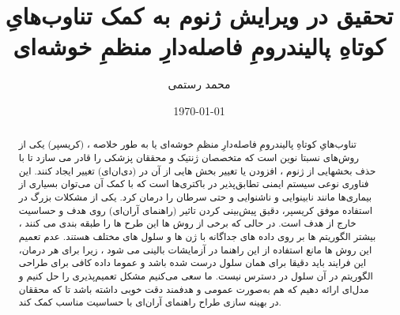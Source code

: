 \documentclass[12pt,a4paper,BCOR=.7cm,headsepline,bibliography=totoc]{report}
\title{تحقیق در ویرایش ژنوم به کمک تناوب‌هایِ کوتاهِ پالیندرومِ فاصله‌دارِ منظمِ خوشه‌ای}
\author{محمد رستمی }
\date{\today}
\begin{document}
\makethesistitle
\begin{abstract}
تناوب‌هایِ کوتاهِ پالیندرومِ فاصله‌دارِ منظمِ خوشه‌ای یا به طور خلاصه ،  (کریسپر) یکی از روش‌های نسبتا نوین است که متخصصان ژنتیک و محققان پزشکی را قادر می سازد تا با حذف بخشهایی از ژنوم ،
افزودن یا تغییر بخش هایی از آن در  (دی‌ان‌ای) تغییر ایجاد کنند. این فناوری نوعی سیستم ایمنی تطابق‌پذیر در باکتری‌ها است که با کمک آن می‌توان بسیاری از بیماری‌ها مانند نابینوایی و ناشنوایی و حتی سرطان را درمان کرد. یکی از مشکلات بزرگ در استفاده موفق کریسپر، دقیق پیش‌بینی کردن تاثیر  (راهنمای آر‌ان‌ای) روی هدف و حساسیت خارج از هدف است. در حالی که برخی از روش ها این طرح ها را طبقه بندی می کنند ، بیشتر
الگوریتم ها بر روی داده های جداگانه با ژن ها و سلول های مختلف هستند. عدم تعمیم این روش ها
مانع استفاده از این راهنما در آزمایشات بالینی می شود ، زیرا برای هر درمان، این فرایند باید دقیقا برای همان سلول درست شده باشد و عموما داده کافی برای طراحی الگوریتم در آن سلول در دسترس نیست. ما سعی می‌کنیم مشکل تعمیم‌پذیری را حل کنیم و مدل‌ای ارائه دهیم که هم به‌صورت عمومی و هدفمند دقت خوبی داشته باشد تا که محققان در بهینه سازی طراح راهنمای آران‌ای با حساسیت مناسب کمک کند.
\end{abstract}
\end{document}

